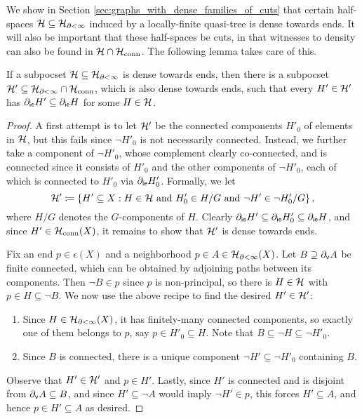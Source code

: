 \documentclass[reqno]{amsart}
\begin{document}
    We show in Section \ref{sec:graphs_with_dense_families_of_cuts} that certain half-spaces $\mathcal{H}\subseteq\mathcal{H}_{\partial<\infty}$ induced by a locally-finite quasi-tree is dense towards ends. It will also be important that these half-spaces be cuts, in that witnesses to density can also be found in $\mathcal{H}\cap\mathcal{H}_\mathrm{conn}$. The following lemma takes care of this.

    \begin{lemma}\label{lem:connected_witness_to_density}
        If a subpocset $\mathcal{H}\subseteq\mathcal{H}_{\partial<\infty}$ is dense towards ends, then there is a subpocset $\mathcal{H}'\subseteq\mathcal{H}_{\partial<\infty}\cap\mathcal{H}_\mathrm{conn}$, which is also dense towards ends, such that every $H'\in\mathcal{H}'$ has $\partial_\mathsf{ie}H'\subseteq\partial_\mathsf{ie}H$ for some $H\in\mathcal{H}$.
    \end{lemma}
    \begin{proof}
        A first attempt is to let $\mathcal{H}'$ be the connected components $H'_0$ of elements in $\mathcal{H}$, but this fails since $\lnot H'_0$ is not necessarily connected. Instead, we further take a component of $\lnot H'_0$, whose complement clearly co-connected, and is connected since it consists of $H'_0$ and the other components of $\lnot H'_0$, each of which is connected to $H'_0$ via $\partial_\mathsf{ie}H'_0$. Formally, we let
        \begin{equation*}
            \mathcal{H}'\coloneqq\left\{H'\subseteq X: H\in\mathcal{H}\textrm{ and }H'_0\in H/G\textrm{ and }\lnot H'\in\lnot H'_0/G\right\},
        \end{equation*}
        where $H/G$ denotes the $G$-components of $H$. Clearly $\partial_\mathsf{ie}H'\subseteq\partial_\mathsf{ie}H'_0\subseteq\partial_\mathsf{ie}H$, and since $H'\in\mathcal{H}_\mathrm{conn}(X)$, it remains to show that $\mathcal{H}'$ is dense towards ends.

        Fix an end $p\in\epsilon(X)$ and a neighborhood $p\in A\in\mathcal{H}_{\partial<\infty}(X)$. Let $B\supseteq\partial_\mathsf{v}A$ be finite connected, which can be obtained by adjoining paths between its components. Then $\lnot B\in p$ since $p$ is non-principal, so there is $H\in\mathcal{H}$ with $p\in H\subseteq\lnot B$. We now use the above recipe to find the desired $H'\in\mathcal{H}'$:
            \begin{enumerate}
                \item Since $H\in\mathcal{H}_{\partial<\infty}(X)$, it has finitely-many connected components, so exactly one of them belongs to $p$, say $p\in H'_0\subseteq H$. Note that $B\subseteq\lnot H\subseteq\lnot H'_0$.
                \item Since $B$ is connected, there is a unique component $\lnot H'\subseteq\lnot H'_0$ containing $B$.
            \end{enumerate}
        Observe that $H'\in\mathcal{H}'$ and $p\in H'$. Lastly, since $H'$ is connected and is disjoint from $\partial_\mathsf{v}A\subseteq B$, and since $H'\subseteq\lnot A$ would imply $\lnot H'\in p$, this forces $H'\subseteq A$, and hence $p\in H'\subseteq A$ as desired.
    \end{proof}
\end{document}
